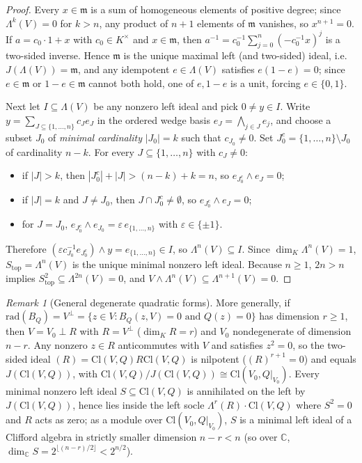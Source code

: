 \documentclass[11pt,a4paper]{article}
\theoremstyle{plain}
\theoremstyle{definition}
\theoremstyle{remark}
\newtheorem{remark}[theorem]{Remark}
\newcommand{\Cl}{\mathrm{Cl}}
\newcommand{\rad}{\mathrm{rad}}
\begin{document}
\begin{proof}
Every $x \in \mathfrak{m}$ is a sum of homogeneous elements of positive degree; since $\Lambda^k(V) = 0$ for $k > n$, any product of $n + 1$ elements of $\mathfrak{m}$ vanishes, so $x^{n+1} = 0$. If $a = c_0 \cdot 1 + x$ with $c_0 \in K^\times$ and $x \in \mathfrak{m}$, then $a^{-1} = c_0^{-1}\sum_{j=0}^n (-c_0^{-1}x)^j$ is a two-sided inverse. Hence $\mathfrak{m}$ is the unique maximal left (and two-sided) ideal, i.e.\ $J(\Lambda(V)) = \mathfrak{m}$, and any idempotent $e \in \Lambda(V)$ satisfies $e(1 - e) = 0$; since $e \in \mathfrak{m}$ or $1 - e \in \mathfrak{m}$ cannot both hold, one of $e, 1 - e$ is a unit, forcing $e \in \{0, 1\}$.

Next let $I \subseteq \Lambda(V)$ be any nonzero left ideal and pick $0 \neq y \in I$. Write $y = \sum_{J \subseteq \{1,\dots,n\}} c_J e_J$ in the ordered wedge basis $e_J = \bigwedge_{j \in J} e_j$, and choose a subset $J_0$ of \emph{minimal cardinality} $|J_0| = k$ such that $c_{J_0} \neq 0$. Set $J_0^c = \{1,\dots,n\} \setminus J_0$ of cardinality $n - k$. For every $J \subseteq \{1,\dots,n\}$ with $c_J \neq 0$:
\begin{itemize}
  \item if $|J| > k$, then $|J_0^c| + |J| > (n - k) + k = n$, so $e_{J_0^c} \wedge e_J = 0$;
  \item if $|J| = k$ and $J \neq J_0$, then $J \cap J_0^c \neq \emptyset$, so $e_{J_0^c} \wedge e_J = 0$;
  \item for $J = J_0$, $e_{J_0^c} \wedge e_{J_0} = \varepsilon \, e_{\{1,\dots,n\}}$ with $\varepsilon \in \{\pm 1\}$.
\end{itemize}
Therefore $(\varepsilon c_{J_0}^{-1} e_{J_0^c}) \wedge y = e_{\{1,\dots,n\}} \in I$, so $\Lambda^n(V) \subseteq I$. Since $\dim_K \Lambda^n(V) = 1$, $S_{\mathrm{top}} = \Lambda^n(V)$ is the unique minimal nonzero left ideal. Because $n \ge 1$, $2n > n$ implies $S_{\mathrm{top}}^2 \subseteq \Lambda^{2n}(V) = 0$, and $V \wedge \Lambda^n(V) \subseteq \Lambda^{n+1}(V) = 0$.
\end{proof}

\begin{remark}[General degenerate quadratic forms]
More generally, if $\rad(B_Q) = V^\perp = \{z \in V : B_Q(z, V) = 0 \text{ and } Q(z) = 0\}$ has dimension $r \ge 1$, then $V = V_0 \perp R$ with $R = V^\perp$ ($\dim_K R = r$) and $V_0$ nondegenerate of dimension $n - r$. Any nonzero $z \in R$ anticommutes with $V$ and satisfies $z^2 = 0$, so the two-sided ideal $(R) = \Cl(V, Q) R \Cl(V, Q)$ is nilpotent ($(R)^{r+1} = 0$) and equals $J(\Cl(V, Q))$, with $\Cl(V, Q)/J(\Cl(V, Q)) \cong \Cl(V_0, Q|_{V_0})$. Every minimal nonzero left ideal $S \subseteq \Cl(V, Q)$ is annihilated on the left by $J(\Cl(V, Q))$, hence lies inside the left socle $\Lambda^r(R) \cdot \Cl(V, Q)$ where $S^2 = 0$ and $R$ acts as zero; as a module over $\Cl(V_0, Q|_{V_0})$, $S$ is a minimal left ideal of a Clifford algebra in strictly smaller dimension $n - r < n$ (so over $\mathbb{C}$, $\dim_{\mathbb{C}} S = 2^{\lfloor (n-r)/2 \rfloor} < 2^{n/2}$).
\end{remark}
\end{document}
